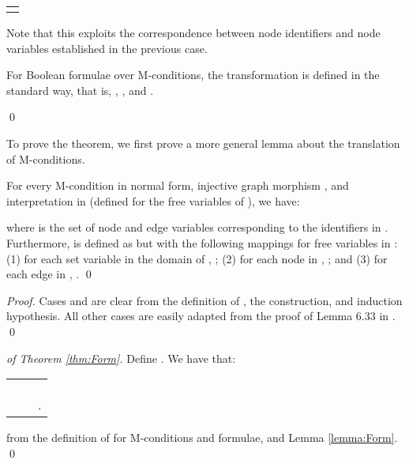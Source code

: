 \documentclass{llncs}
\begin{document}
\begin{theorem}
\begin{center}
\begin{tabular}{l}
			\vspace{5pt}\hspace{0.5in}
		\end{tabular}
		\end{center}


	\noindent Note that this exploits the correspondence between node identifiers and node variables established in the previous case.

	For Boolean formulae over M-conditions, the transformation  is defined in the standard way, that is, , , and .

	\qed
	\end{theorem}
	
	To prove the theorem, we first prove a more general lemma about the translation of M-conditions.
	
	\begin{lemma}\label{lemma:Form}\rm
		For every M-condition  in normal form, injective graph morphism , and interpretation  in  (defined for the free variables of ), we have:
		
		
		\noindent where  is the set of node and edge variables corresponding to the identifiers in . Furthermore,  is defined as  but with the following mappings for free variables in : (1) for each set variable  in the domain of , ; (2) for each node  in , ; and (3) for each edge  in , .
		\qed
	\end{lemma}
	
	\begin{proof}
		Cases  and  are clear from the definition of , the construction, and induction hypothesis. All other cases are easily adapted from the proof of Lemma 6.33 in \cite{Poskitt13a}.
		\qed
	\end{proof}
	
	
	\begin{proof}[of Theorem \ref{thm:Form}]
		Define . We have that:
		
		\begin{center}\begin{tabular}{r c l}
			 &&  \\
			&&  \\
			&&  \\
			&& .
		\end{tabular}\end{center}
		
		\noindent from the definition of  for M-conditions and formulae, and Lemma \ref{lemma:Form}.
		\qed
	\end{proof}
	
\end{document}
